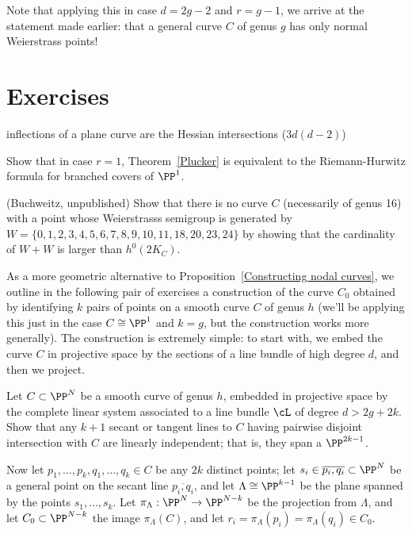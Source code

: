 Note that applying this in case $d=2g-2$ and $r = g-1$, we arrive at the statement made earlier: that a general curve $C$ of genus $g$ has only normal Weierstrass points!

\section{Exercises}
\begin{exercise}\label{Hessian exercise}
 inflections of a plane curve are the Hessian intersections ($3d(d-2)$)
\end{exercise}

\begin{exercise}
Show that in case $r=1$, Theorem~\ref{Plucker} is equivalent to the Riemann-Hurwitz formula for branched covers of $\PP^1$.
\end{exercise}

\begin{exercise}(Buchweitz, unpublished)
Show that there is no curve $C$ (necessarily of genus 16) with a point whose Weierstrasss semigroup
is generated by
$W =\{0,1,2,3,4,5,6,7,8,9,10,11, 18,20,23,24\}$
by showing that the cardinality of $W+W$ is larger than $h^0(2K_C)$.
\end{exercise}

As a more geometric alternative to Proposition~\ref{Constructing nodal curves}, we outline in the following pair of exercises a construction of the curve $C_0$ obtained by identifying $k$ pairs of points on a smooth curve $C$ of genus $h$ (we'll be applying this just in the case $C \cong \PP^1$ and $k=g$, but the construction works more generally). The construction is extremely simple: to start with, we embed the curve $C$ in projective space by the sections of a line bundle of high degree $d$, and then we project.

\begin{exercise}\label{independent secants} Let $C \subset \PP^N$ be a smooth curve of genus $h$, embedded in projective space by the complete linear system associated to a line bundle $\cL$ of degree $d > 2g + 2k$. Show that any $k+1$ secant or tangent lines to $C$  having pairwise disjoint intersection with $C$ are linearly independent; that is, they span a $\PP^{2k-1}$.
\end{exercise}

Now let $p_1,\dots,p_k, q_1,\dots, q_k \in C$ be any $2k$ distinct points; let $s_i \in \overline{p_i,q_i} \subset \PP^N$ be a general point on the secant line $\overline{p_i,q_i} $, and let $\Lambda \cong \PP^{k-1}$ be the plane spanned by the points $s_1,\dots,s_k$. Let $\pi_\Lambda : \PP^N \to \PP^{N-k}$ be the projection from $\Lambda$, and let $C_0 \subset \PP^{N-k}$ the image $\pi_\Lambda(C)$, and let $r_i = \pi_\Lambda(p_i) = \pi_\Lambda(q_i) \in C_0$.

